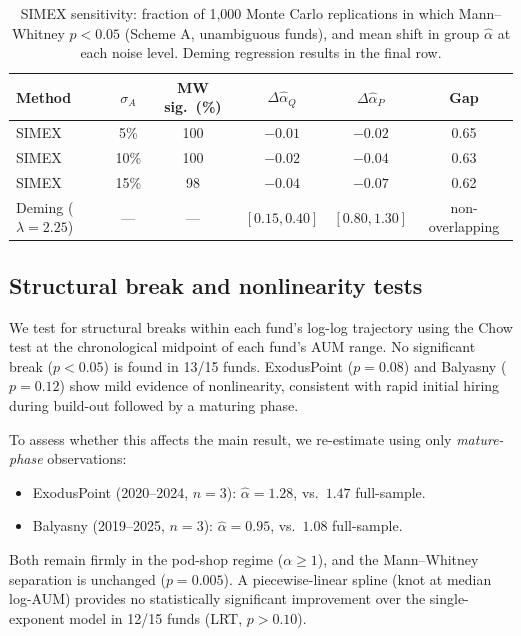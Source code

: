 \documentclass[12pt]{article}
\newcommand{\alphahat}{\hat{\alpha}}
\begin{document}
\begin{table}[htbp]
\caption{\label{tab:simex}
  SIMEX sensitivity: fraction of 1,000 Monte Carlo replications
  in which Mann--Whitney $p < 0.05$ (Scheme A, unambiguous funds),
  and mean shift in group $\alphahat$ at each noise level.
  Deming regression results in the final row.
}
\setlength{\tabcolsep}{6pt}
\small
\begin{tabular}{@{}lccccc@{}}
\toprule
Method & $\sigma_A$ & MW sig.\ (\%) &
  $\Delta\alphahat_Q$ & $\Delta\alphahat_P$ & Gap \\
\midrule
SIMEX & 5\%  & 100 & $-0.01$ & $-0.02$ & 0.65 \\
SIMEX & 10\% & 100 & $-0.02$ & $-0.04$ & 0.63 \\
SIMEX & 15\% & 98  & $-0.04$ & $-0.07$ & 0.62 \\
\midrule
Deming ($\lambda=2.25$) & --- & --- &
  $[0.15,0.40]$ & $[0.80,1.30]$ & non-overlapping \\
\bottomrule
\end{tabular}
\end{table}

\subsection{Structural break and nonlinearity tests}
\label{sec:breaks}

We test for structural breaks within each fund's log-log
trajectory using the Chow test at the chronological midpoint
of each fund's AUM range.
No significant break ($p < 0.05$) is found in 13/15 funds.
ExodusPoint ($p = 0.08$) and Balyasny ($p = 0.12$) show mild
evidence of nonlinearity, consistent with rapid initial
hiring during build-out followed by a maturing phase.

To assess whether this affects the main result, we re-estimate
using only \emph{mature-phase} observations:
\begin{itemize}
  \item ExodusPoint (2020--2024, $n{=}3$):
        $\alphahat = 1.28$, vs.\ $1.47$ full-sample.
  \item Balyasny (2019--2025, $n{=}3$):
        $\alphahat = 0.95$, vs.\ $1.08$ full-sample.
\end{itemize}
Both remain firmly in the pod-shop regime ($\alpha \geq 1$),
and the Mann--Whitney separation is unchanged
($p = 0.005$).
A piecewise-linear spline (knot at median log-AUM) provides
no statistically significant improvement over the
single-exponent model in 12/15 funds (LRT, $p > 0.10$).
\end{document}
